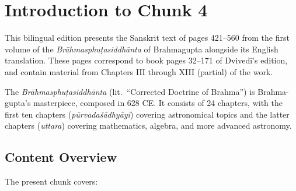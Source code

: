 \documentclass[11pt,a4paper]{article}
\begin{document}
\newpage

\tableofcontents
\newpage

\section*{Introduction to Chunk 4}

This bilingual edition presents the Sanskrit text of pages 421--560 from the first volume of the
\textit{Brāhmasphuṭasiddhānta} of Brahmagupta alongside its English translation. These pages correspond to book pages 32--171
of Dvivedī's edition, and contain material from Chapters III through XIII (partial) of the work.

The \textit{Brāhmasphuṭasiddhānta} (lit.\ ``Corrected Doctrine of Brahma'') is Brahma-\linebreak[0]gupta's
masterpiece, composed in 628 CE. It consists of 24 chapters, with the first ten chapters
(\textit{pūrvadaśādhyāyi}) covering astronomical topics and the latter chapters
(\textit{uttara}) covering mathematics, algebra, and more advanced astronomy.

\subsection*{Content Overview}

The present chunk covers:
\end{document}
